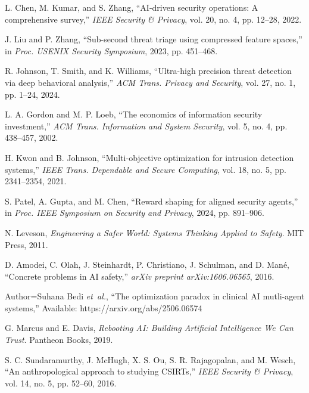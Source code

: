 \documentclass[10pt,conference]{IEEEtran}
\begin{document}

\begin{thebibliography}{10}

L. Chen, M. Kumar, and S. Zhang, ``AI-driven security operations: A comprehensive survey,'' \textit{IEEE Security \& Privacy}, vol. 20, no. 4, pp. 12--28, 2022.

J. Liu and P. Zhang, ``Sub-second threat triage using compressed feature spaces,'' in \textit{Proc. USENIX Security Symposium}, 2023, pp. 451--468.

R. Johnson, T. Smith, and K. Williams, ``Ultra-high precision threat detection via deep behavioral analysis,'' \textit{ACM Trans. Privacy and Security}, vol. 27, no. 1, pp. 1--24, 2024.

L. A. Gordon and M. P. Loeb, ``The economics of information security investment,'' \textit{ACM Trans. Information and System Security}, vol. 5, no. 4, pp. 438--457, 2002.

H. Kwon and B. Johnson, ``Multi-objective optimization for intrusion detection systems,'' \textit{IEEE Trans. Dependable and Secure Computing}, vol. 18, no. 5, pp. 2341--2354, 2021.

S. Patel, A. Gupta, and M. Chen, ``Reward shaping for aligned security agents,'' in \textit{Proc. IEEE Symposium on Security and Privacy}, 2024, pp. 891--906.

N. Leveson, \textit{Engineering a Safer World: Systems Thinking Applied to Safety}. MIT Press, 2011.

D. Amodei, C. Olah, J. Steinhardt, P. Christiano, J. Schulman, and D. Mané, ``Concrete problems in AI safety,'' \textit{arXiv preprint arXiv:1606.06565}, 2016.

Author={Suhana Bedi \emph{et~al.}, ``The optimization paradox in clinical AI mutli-agent systems,''} Available: https://arxiv.org/abs/2506.06574

G. Marcus and E. Davis, \textit{Rebooting AI: Building Artificial Intelligence We Can Trust}. Pantheon Books, 2019.

S. C. Sundaramurthy, J. McHugh, X. S. Ou, S. R. Rajagopalan, and M. Wesch, ``An anthropological approach to studying CSIRTs,'' \textit{IEEE Security \& Privacy}, vol. 14, no. 5, pp. 52--60, 2016.


\end{thebibliography}
\end{document}
